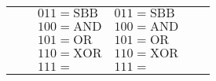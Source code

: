 \begin{frame}
\begin{table}[]
{\begin{tabular}{|l|l||l|l|l|l|}
                                                  &                                          & $011=\text{SBB}$ & $011=\text{SBB}$ &  &  \\ \cline{3-6}
                                                  &                                          & $100=\text{AND}$ & $100=\text{AND}$ &  &  \\ \cline{3-6}
                                                  &                                          & $101=\text{OR}$ & $101=\text{OR}$ &  &  \\ \cline{3-6}
                                                  &                                          & $110=\text{XOR}$ & $110=\text{XOR}$ &  &  \\ \cline{3-6}
                                                  &                                          & $111=$ & $111=$ &  &  \\ \hline

            \end{tabular}
        }
    \end{table}
    

\end{frame}